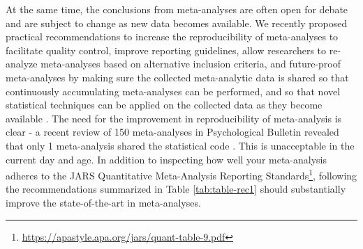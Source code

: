\documentclass[
  oneside]{krantz}
\renewcommand{\href}[2]{#2\footnote{\url{#1}}}
\begin{document}
At the same time, the conclusions from meta-analyses are often open for debate and are subject to change as new data becomes available. We recently proposed practical recommendations to increase the reproducibility of meta-analyses to facilitate quality control, improve reporting guidelines, allow researchers to re-analyze meta-analyses based on alternative inclusion criteria, and future-proof meta-analyses by making sure the collected meta-analytic data is shared so that continuously accumulating meta-analyses can be performed, and so that novel statistical techniques can be applied on the collected data as they become available \citep{lakens_reproducibility_2016}. The need for the improvement in reproducibility of meta-analysis is clear - a recent review of 150 meta-analyses in Psychological Bulletin revealed that only 1 meta-analysis shared the statistical code \citep{polanin_transparency_2020}. This is unacceptable in the current day and age. In addition to inspecting how well your meta-analysis adheres to the \href{https://apastyle.apa.org/jars/quant-table-9.pdf}{JARS Quantitative Meta-Analysis Reporting Standards}, following the recommendations summarized in Table \ref{tab:table-rec1} should substantially improve the state-of-the-art in meta-analyses.
\end{document}
